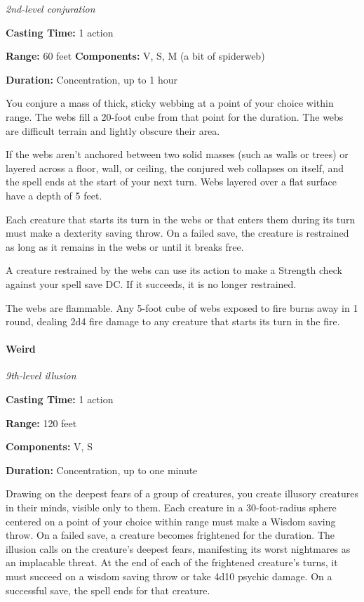 \documentclass[
]{article}
\begin{document}
\emph{2nd-level conjuration}

\textbf{Casting Time:} 1 action

\textbf{Range:} 60 feet \textbf{Components:} V, S, M (a bit of
spiderweb)

\textbf{Duration:} Concentration, up to 1 hour

You conjure a mass of thick, sticky webbing at a point of your choice
within range. The webs fill a 20-foot cube from that point for the
duration. The webs are difficult terrain and lightly obscure their area.

If the webs aren't anchored between two solid masses (such as walls or
trees) or layered across a floor, wall, or ceiling, the conjured web
collapses on itself, and the spell ends at the start of your next turn.
Webs layered over a flat surface have a depth of 5 feet.

Each creature that starts its turn in the webs or that enters them
during its turn must make a dexterity saving throw. On a failed save,
the creature is restrained as long as it remains in the webs or until it
breaks free.

A creature restrained by the webs can use its action to make a Strength
check against your spell save DC. If it succeeds, it is no longer
restrained.

The webs are flammable. Any 5-foot cube of webs exposed to fire burns
away in 1 round, dealing 2d4 fire damage to any creature that starts its
turn in the fire.

\hypertarget{weird}{%
\paragraph{Weird}\label{weird}}

\emph{9th-level illusion}

\textbf{Casting Time:} 1 action

\textbf{Range:} 120 feet

\textbf{Components:} V, S

\textbf{Duration:} Concentration, up to one minute

Drawing on the deepest fears of a group of creatures, you create
illusory creatures in their minds, visible only to them. Each creature
in a 30-foot-radius sphere centered on a point of your choice within
range must make a Wisdom saving throw. On a failed save, a creature
becomes frightened for the duration. The illusion calls on the
creature's deepest fears, manifesting its worst nightmares as an
implacable threat. At the end of each of the frightened creature's
turns, it must succeed on a wisdom saving throw or take 4d10 psychic
damage. On a successful save, the spell ends for that creature.
\end{document}
